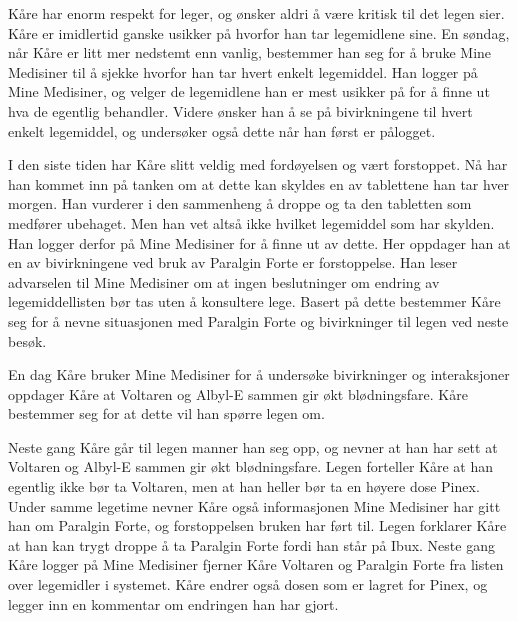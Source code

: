 Kåre har enorm respekt for leger, og ønsker aldri å være kritisk til det legen sier. Kåre er imidlertid ganske usikker på hvorfor han tar legemidlene sine. En søndag, når Kåre er litt mer nedstemt enn vanlig, bestemmer han seg for å bruke Mine Medisiner til å sjekke hvorfor han tar hvert enkelt legemiddel. Han logger på Mine Medisiner, og velger de legemidlene han er mest usikker på for å finne ut hva de egentlig behandler. Videre ønsker han å se på bivirkningene til hvert enkelt legemiddel, og undersøker også dette når han først er pålogget. 

I den siste tiden har Kåre slitt veldig med fordøyelsen og vært forstoppet. Nå har han kommet inn på tanken om at dette kan skyldes en av tablettene han tar hver morgen. Han vurderer i den sammenheng å droppe og ta den tabletten som medfører ubehaget. Men han vet altså ikke hvilket legemiddel som har skylden. Han logger derfor på Mine Medisiner for å finne ut av dette. Her oppdager han at en av bivirkningene ved bruk av Paralgin Forte er forstoppelse. Han leser advarselen til Mine Medisiner om at ingen beslutninger om endring av legemiddellisten bør tas uten å konsultere lege. Basert på dette bestemmer Kåre seg for å nevne situasjonen med Paralgin Forte og bivirkninger til legen ved neste besøk. 

En dag Kåre bruker Mine Medisiner for å undersøke bivirkninger og interaksjoner oppdager Kåre at Voltaren og Albyl-E sammen gir økt blødningsfare. Kåre bestemmer seg for at dette vil han spørre legen om. 

Neste gang Kåre går til legen manner han seg opp, og nevner at han har sett at Voltaren og Albyl-E sammen gir økt blødningsfare. Legen forteller Kåre at han egentlig ikke bør ta Voltaren, men at han heller bør ta en høyere dose Pinex. Under samme legetime nevner Kåre også informasjonen Mine Medisiner har gitt han om Paralgin Forte, og forstoppelsen bruken har ført til. Legen forklarer Kåre at han kan trygt droppe å ta Paralgin Forte fordi han står på Ibux. Neste gang Kåre logger på Mine Medisiner fjerner Kåre Voltaren og Paralgin Forte fra listen over legemidler i systemet. Kåre endrer også dosen som er lagret for Pinex, og legger inn en kommentar om endringen han har gjort.